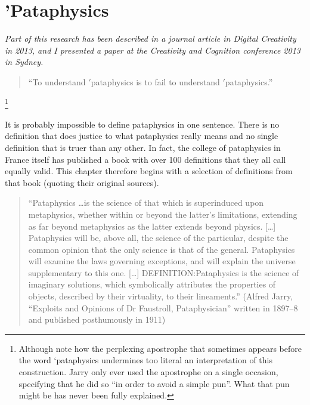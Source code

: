 
\chapter[Pataphysics]{'Pataphysics}
\label{ch:pataphysics}

\emph{Part of this research has been described in a journal article in Digital Creativity in 2013, and I presented a paper at the Creativity and Cognition conference 2013 in Sydney.}

\grule{}

\begin{quote}
  ``To understand $'$pataphysics is to fail to understand $'$pataphysics.'' \citep{Hugill2012a}
\end{quote}

\footnote{Although note how the perplexing apostrophe that sometimes appears before the word ‘pataphysics undermines too literal an interpretation of this construction. Jarry only ever used the apostrophe on a single occasion, specifying that he did so ``in order to avoid a simple pun''. What that pun might be has never been fully explained.}

It is probably impossible to define pataphysics in one sentence. There is no definition that does justice to what pataphysics really means and no single definition that is truer than any other. In fact, the college of pataphysics in France itself has published a book \citep{Brotchie2003} with over 100 definitions that they all call equally valid. This chapter therefore begins with a selection of definitions from that book (quoting their original sources).

\begin{quote}
  ``Pataphysics \ldots is the science of that which is superinduced upon metaphysics, whether within or beyond the latter's limitations, extending as far beyond metaphysics as the latter extends beyond physics. [\ldots] Pataphysics will be, above all, the science of the particular, despite the common opinion that the only science is that of the general. Pataphysics will examine the laws governing exceptions, and will explain the universe supplementary to this one. [\ldots] DEFINITION:\@ Pataphysics is the science of imaginary solutions, which symbolically attributes the properties of objects, described by their virtuality, to their lineaments.'' (Alfred Jarry, ``Exploits and Opinions of Dr Faustroll, Pataphysician'' written in 1897--8 and published posthumously in 1911) \citep{Jarry1996}
\end{quote}

